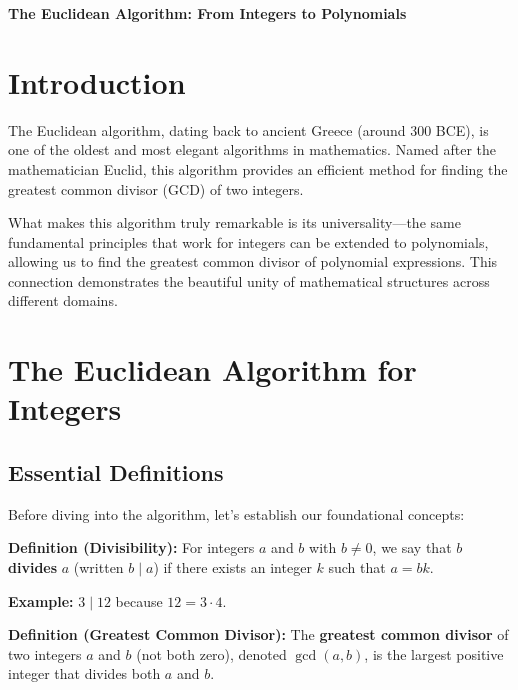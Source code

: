 \documentclass[12pt]{article}
\begin{document}
\begin{center}
\textbf{\Large The Euclidean Algorithm: From Integers to Polynomials} \\
\vspace{0.5cm}
\hspace{0.1\textwidth}
\end{center}

\vspace{0.5cm}

\section{Introduction}

The Euclidean algorithm, dating back to ancient Greece (around 300 BCE), is one of the oldest and most elegant algorithms in mathematics. Named after the mathematician Euclid, this algorithm provides an efficient method for finding the greatest common divisor (GCD) of two integers. 

What makes this algorithm truly remarkable is its universality—the same fundamental principles that work for integers can be extended to polynomials, allowing us to find the greatest common divisor of polynomial expressions. This connection demonstrates the beautiful unity of mathematical structures across different domains.

\section{The Euclidean Algorithm for Integers}

\subsection{Essential Definitions}

Before diving into the algorithm, let's establish our foundational concepts:

\textbf{Definition (Divisibility):} For integers $a$ and $b$ with $b \neq 0$, we say that $b$ \textbf{divides} $a$ (written $b \mid a$) if there exists an integer $k$ such that $a = bk$.

\textbf{Example:} $3 \mid 12$ because $12 = 3 \cdot 4$.

\textbf{Definition (Greatest Common Divisor):} The \textbf{greatest common divisor} of two integers $a$ and $b$ (not both zero), denoted $\gcd(a, b)$, is the largest positive integer that divides both $a$ and $b$.
\end{document}
